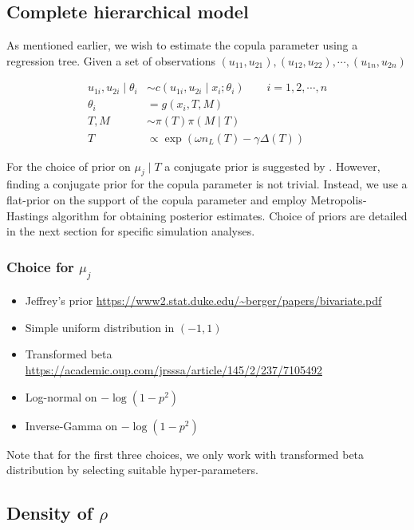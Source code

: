 \documentclass{amsart}
\begin{document}
\subsection{Complete hierarchical model}
As mentioned earlier, we wish to estimate the copula parameter using a regression tree. Given a set of observations $(u_{11}, u_{21}), (u_{12}, u_{22}), \cdots, (u_{1n}, u_{2n})$

\begin{align}
    u_{1i}, u_{2i} \mid \theta_i &\sim c(u_{1i},u_{2i}\mid x_i;\theta_i) \qquad i = 1,2,\cdots, n  \\
    \theta_i & = g(x_i, T, M)\\
    T, M &\sim \pi(T)\pi(M\mid T)\\
	T &\propto \exp\left(\omega n_L(T)-\gamma\Delta(T)\right)
\end{align}

For the choice of prior on $\mu_j\mid T$ a conjugate prior is suggested by \citet{chipman_BART,serafini2024lossbasedpriortreetopologies}. However, finding a conjugate prior for the copula parameter is not trivial. Instead, we use a flat-prior on the support of the copula parameter and employ Metropolis-Hastings algorithm for obtaining posterior estimates. Choice of priors are detailed in the next section for specific simulation analyses.


\iffalse

\subsubsection{Choice for $\mu_j$}
\begin{itemize}
    \item Jeffrey's prior \url{https://www2.stat.duke.edu/~berger/papers/bivariate.pdf}
    \item Simple uniform distribution in $(-1,1)$ 
    \item Transformed beta \url{https://academic.oup.com/jrsssa/article/145/2/237/7105492}
    \item Log-normal on $-\log(1-p^2)$
    \item Inverse-Gamma on $-\log(1-p^2)$
\end{itemize}
Note that for the first three choices, we only work with transformed beta distribution by 
selecting suitable hyper-parameters.

\subsection{Density of $\rho$}
\end{document}
